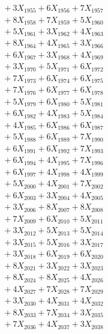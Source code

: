 \documentclass[a4paper,10pt]{article}
\begin{document}
{\begin{align}
&\;  + 3 X_{1955} + 6 X_{1956} + 7 X_{1957} \\[0.3ex]
&\;  + 8 X_{1958} + 7 X_{1959} + 5 X_{1960} \\[0.5ex]\allowbreak
&\;  + 5 X_{1961} + 3 X_{1962} + 4 X_{1963} \\[0.3ex]
&\;  + 8 X_{1964} + 4 X_{1965} + 3 X_{1966} \\[0.3ex]
&\;  + 6 X_{1967} + 3 X_{1968} + 4 X_{1969} \\[0.3ex]
&\;  + 3 X_{1970} + 5 X_{1971} + 6 X_{1972} \\[0.3ex]
&\;  + 7 X_{1973} + 6 X_{1974} + 6 X_{1975} \\[0.3ex]
&\;  + 7 X_{1976} + 6 X_{1977} + 6 X_{1978} \\[0.3ex]
&\;  + 5 X_{1979} + 6 X_{1980} + 5 X_{1981} \\[0.3ex]
&\;  + 6 X_{1982} + 4 X_{1983} + 5 X_{1984} \\[0.3ex]
&\;  + 4 X_{1985} + 6 X_{1986} + 6 X_{1987} \\[0.3ex]
&\;  + 5 X_{1988} + 6 X_{1989} + 7 X_{1990} \\[0.5ex]\allowbreak
&\;  + 6 X_{1991} + 6 X_{1992} + 7 X_{1993} \\[0.3ex]
&\;  + 6 X_{1994} + 4 X_{1995} + 7 X_{1996} \\[0.3ex]
&\;  + 6 X_{1997} + 4 X_{1998} + 4 X_{1999} \\[0.3ex]
&\;  + 5 X_{2000} + 4 X_{2001} + 7 X_{2002} \\[0.3ex]
&\;  + 6 X_{2003} + 3 X_{2004} + 4 X_{2005} \\[0.3ex]
&\;  + 3 X_{2006} + 8 X_{2007} + 8 X_{2008} \\[0.3ex]
&\;  + 7 X_{2009} + 6 X_{2010} + 5 X_{2011} \\[0.3ex]
&\;  + 3 X_{2012} + 5 X_{2013} + 5 X_{2014} \\[0.3ex]
&\;  + 3 X_{2015} + 5 X_{2016} + 3 X_{2017} \\[0.3ex]
&\;  + 3 X_{2018} + 6 X_{2019} + 6 X_{2020} \\[0.5ex]\allowbreak
&\;  + 8 X_{2021} + 3 X_{2022} + 3 X_{2023} \\[0.3ex]
&\;  + 8 X_{2024} + 8 X_{2025} + 4 X_{2026} \\[0.3ex]
&\;  + 4 X_{2027} + 7 X_{2028} + 7 X_{2029} \\[0.3ex]
&\;  + 3 X_{2030} + 4 X_{2031} + 4 X_{2032} \\[0.3ex]
&\;  + 8 X_{2033} + 7 X_{2034} + 3 X_{2035} \\[0.3ex]
&\;  + 7 X_{2036} + 4 X_{2037} + 3 X_{2038} \\[0.3ex]

\end{align}}
\end{document}
